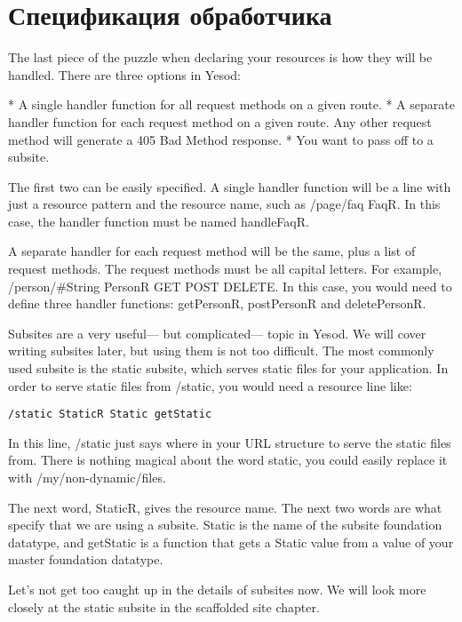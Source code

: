\section{Спецификация обработчика}

The last piece of the puzzle when declaring your resources is how they
will be handled. There are three options in Yesod:

* A single handler function for all request methods on a given route.
* A separate handler function for each request method on a given route. Any other request method will generate a 405 Bad Method response.
* You want to pass off to a subsite.

The first two can be easily specified. A single handler function will
be a line with just a resource pattern and the resource name, such as
/page/faq FaqR. In this case, the handler function must be named
handleFaqR.

A separate handler for each request method will be the same, plus a
list of request methods. The request methods must be all capital
letters. For example, /person/#String PersonR GET POST DELETE. In this
case, you would need to define three handler functions: getPersonR,
postPersonR and deletePersonR.

Subsites are a very useful— but complicated— topic in Yesod. We will
cover writing subsites later, but using them is not too difficult. The
most commonly used subsite is the static subsite, which serves static
files for your application. In order to serve static files from
/static, you would need a resource line like:

\begin{verbatim}
/static StaticR Static getStatic
\end{verbatim}

In this line, /static just says where in your URL structure to serve
the static files from. There is nothing magical about the word static,
you could easily replace it with /my/non-dynamic/files.

The next word, StaticR, gives the resource name. The next two words
are what specify that we are using a subsite. Static is the name of
the subsite foundation datatype, and getStatic is a function that gets
a Static value from a value of your master foundation datatype.

Let's not get too caught up in the details of subsites now. We will
look more closely at the static subsite in the scaffolded site
chapter.


